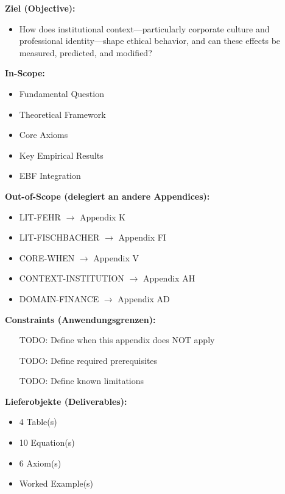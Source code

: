 \begin{tcolorbox}[
    colback=orange!5!white,
    colframe=orange!75!black,
    title={\textbf{Appendix Scope: Ziel / In-Scope / Out-of-Scope / Constraints}},
    fonttitle=\bfseries
]

\textbf{Ziel (Objective):}
\begin{itemize}[nosep]
    \item How does institutional context---particularly corporate culture and professional identity---shape ethical behavior, and can these effects be measured, predicted, and modified?
\end{itemize}

\textbf{In-Scope:}
\begin{itemize}[nosep]
    \item Fundamental Question
    \item Theoretical Framework
    \item Core Axioms
    \item Key Empirical Results
    \item EBF Integration
\end{itemize}

\textbf{Out-of-Scope (delegiert an andere Appendices):}
\begin{itemize}[nosep]
    \item LIT-FEHR $\rightarrow$ Appendix K
    \item LIT-FISCHBACHER $\rightarrow$ Appendix FI
    \item CORE-WHEN $\rightarrow$ Appendix V
    \item CONTEXT-INSTITUTION $\rightarrow$ Appendix AH
    \item DOMAIN-FINANCE $\rightarrow$ Appendix AD
\end{itemize}

\textbf{Constraints (Anwendungsgrenzen):}
\begin{itemize}[nosep]
    \item [TODO: Define when this appendix does NOT apply]
    \item [TODO: Define required prerequisites]
    \item [TODO: Define known limitations]
\end{itemize}

\textbf{Lieferobjekte (Deliverables):}
\begin{itemize}[nosep]
    \item 4 Table(s)
    \item 10 Equation(s)
    \item 6 Axiom(s)
    \item Worked Example(s)
\end{itemize}

\end{tcolorbox}


